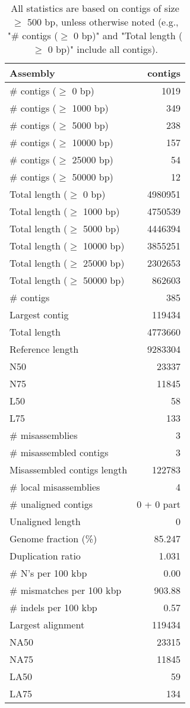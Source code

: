 \documentclass[12pt,a4paper]{article}
\begin{document}
\begin{table}[ht]
\begin{center}
\caption{All statistics are based on contigs of size $\geq$ 500 bp, unless otherwise noted (e.g., "\# contigs ($\geq$ 0 bp)" and "Total length ($\geq$ 0 bp)" include all contigs).}
\begin{tabular}{|l*{1}{|r}|}
\hline
Assembly & contigs \\ \hline
\# contigs ($\geq$ 0 bp) & 1019 \\ \hline
\# contigs ($\geq$ 1000 bp) & 349 \\ \hline
\# contigs ($\geq$ 5000 bp) & 238 \\ \hline
\# contigs ($\geq$ 10000 bp) & 157 \\ \hline
\# contigs ($\geq$ 25000 bp) & 54 \\ \hline
\# contigs ($\geq$ 50000 bp) & 12 \\ \hline
Total length ($\geq$ 0 bp) & 4980951 \\ \hline
Total length ($\geq$ 1000 bp) & 4750539 \\ \hline
Total length ($\geq$ 5000 bp) & 4446394 \\ \hline
Total length ($\geq$ 10000 bp) & 3855251 \\ \hline
Total length ($\geq$ 25000 bp) & 2302653 \\ \hline
Total length ($\geq$ 50000 bp) & 862603 \\ \hline
\# contigs & 385 \\ \hline
Largest contig & 119434 \\ \hline
Total length & 4773660 \\ \hline
Reference length & 9283304 \\ \hline
N50 & 23337 \\ \hline
N75 & 11845 \\ \hline
L50 & 58 \\ \hline
L75 & 133 \\ \hline
\# misassemblies & 3 \\ \hline
\# misassembled contigs & 3 \\ \hline
Misassembled contigs length & 122783 \\ \hline
\# local misassemblies & 4 \\ \hline
\# unaligned contigs & 0 + 0 part \\ \hline
Unaligned length & 0 \\ \hline
Genome fraction (\%) & 85.247 \\ \hline
Duplication ratio & 1.031 \\ \hline
\# N's per 100 kbp & 0.00 \\ \hline
\# mismatches per 100 kbp & 903.88 \\ \hline
\# indels per 100 kbp & 0.57 \\ \hline
Largest alignment & 119434 \\ \hline
NA50 & 23315 \\ \hline
NA75 & 11845 \\ \hline
LA50 & 59 \\ \hline
LA75 & 134 \\ \hline
\end{tabular}
\end{center}
\end{table}
\end{document}
